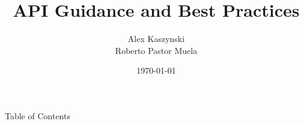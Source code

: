 \documentclass[t]{beamer}
\begin{document}

\title{API Guidance and Best Practices}
\author{Alex Kaszynski \\ Roberto Pastor Muela}
\date{\today}

\titleframe{}



\begin{frame}{Table of Contents}
  \tableofcontents
  \vspace{200pt}  %
\end{frame}


\end{document}
